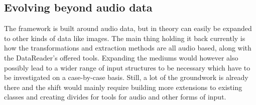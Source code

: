\subsection{Evolving beyond audio data}

The framework is built around audio data, but in theory can easily be expanded to other kinds of data like images. The main thing holding it back currently is how the transformations and extraction methods are all audio based, along with the DataReader's offered tools. Expanding the mediums would however also possibly lead to a wider range of input structures to be necessary which have to be investigated on a case-by-case basis. Still, a lot of the groundwork is already there and the shift would mainly require building more extensions to existing classes and creating divides for tools for audio and other forms of input.

